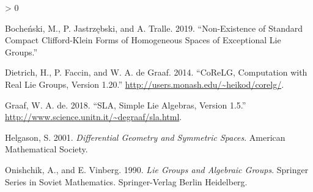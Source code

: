\documentclass[
]{article}
\newlength{\cslhangindent}
\newenvironment{CSLReferences}[2] %
 {%
  \setlength{\parindent}{0pt}
  \ifodd #1 \everypar{\setlength{\hangindent}{\cslhangindent}}\ignorespaces\fi
  \ifnum #2 > 0
  \setlength{\parskip}{#2\baselineskip}
  \fi
 }%
 {}
\begin{document}
\hypertarget{refs}{}
\begin{CSLReferences}{1}{0}
\leavevmode\hypertarget{ref-BJT}{}%
Bocheński, M., P. Jastrzębski, and A. Tralle. 2019. {``Non-Existence of
Standard Compact Clifford-Klein Forms of Homogeneous Spaces of
Exceptional Lie Groups.''}

\leavevmode\hypertarget{ref-CoReLG}{}%
Dietrich, H., P. Faccin, and W. A. de Graaf. 2014. {``CoReLG,
Computation with Real Lie Groups, Version 1.20.''}
\url{http://users.monash.edu/~heikod/corelg/}.

\leavevmode\hypertarget{ref-sla}{}%
Graaf, W. A. de. 2018. {``SLA, Simple Lie Algebras, Version 1.5.''}
\url{http://www.science.unitn.it/~degraaf/sla.html}.

\leavevmode\hypertarget{ref-helgason}{}%
Helgason, S. 2001. \emph{Differential Geometry and Symmetric Spaces}.
American Mathematical Society.

\leavevmode\hypertarget{ref-onvin}{}%
Onishchik, A., and E. Vinberg. 1990. \emph{Lie Groups and Algebraic
Groups}. Springer Series in Soviet Mathematics. Springer-Verlag Berlin
Heidelberg.

\end{CSLReferences}
\end{document}
